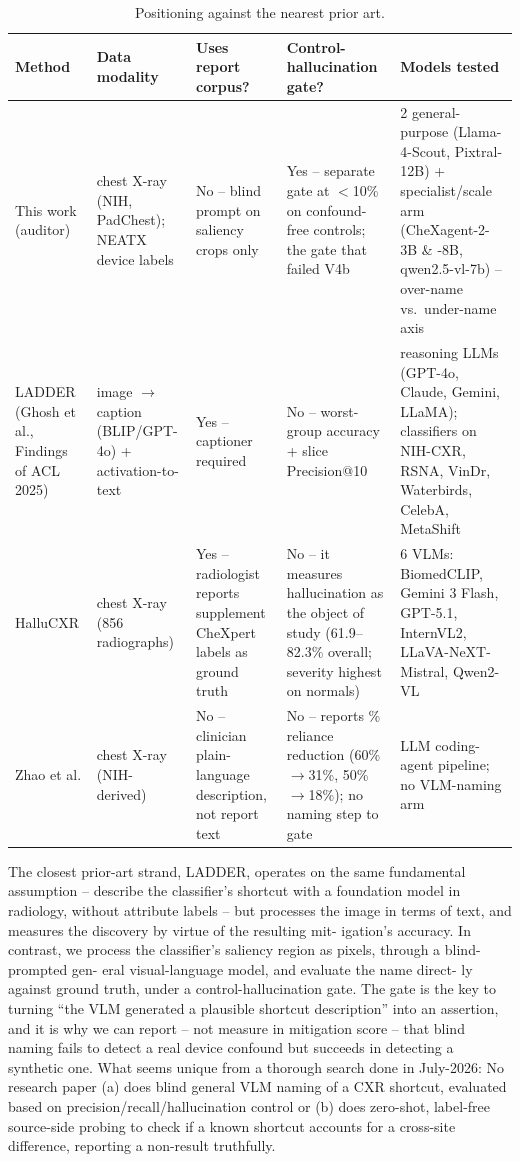 \documentclass{ieeeaccess}
\begin{document}
\begin{table}[t]
\caption{Positioning against the nearest prior art.}
\label{tab:positioning}
\centering
\small
\begin{tabular}{|p{70pt}|p{110pt}|p{80pt}|p{110pt}|p{110pt}|}
\hline
Method & Data modality & Uses report corpus? & Control-hallucination gate? & Models tested \\
\hline
This work (auditor) & chest X-ray (NIH, PadChest); NEATX device labels &
No -- blind prompt on saliency crops only &
Yes -- separate gate at $<$10\% on confound-free controls; the gate that
failed V4b &
2 general-purpose (Llama-4-Scout, Pixtral-12B) + specialist/scale arm
(CheXagent-2-3B \& -8B, qwen2.5-vl-7b) -- over-name vs.\ under-name axis \\
\hline
LADDER (Ghosh et al., Findings of ACL 2025) & image $\rightarrow$ caption
(BLIP/GPT-4o) + activation-to-text & Yes -- captioner required & No --
worst-group accuracy + slice Precision@10 & reasoning LLMs (GPT-4o, Claude,
Gemini, LLaMA); classifiers on NIH-CXR, RSNA, VinDr, Waterbirds, CelebA,
MetaShift \\
\hline
HalluCXR & chest X-ray (856 radiographs) & Yes -- radiologist reports
supplement CheXpert labels as ground truth & No -- it measures hallucination
as the object of study (61.9--82.3\% overall; severity highest on normals) &
6 VLMs: BiomedCLIP, Gemini 3 Flash, GPT-5.1, InternVL2, LLaVA-NeXT-Mistral,
Qwen2-VL \\
\hline
Zhao et al. & chest X-ray (NIH-derived) & No -- clinician plain-language
description, not report text & No -- reports \% reliance reduction
(60\%$\rightarrow$31\%, 50\%$\rightarrow$18\%); no naming step to gate & LLM
coding-agent pipeline; no VLM-naming arm \\
\hline
\end{tabular}
\end{table}


The closest prior-art strand, LADDER, operates on the
same fundamental assumption – describe the classifier’s
shortcut with a foundation model in radiology, without
attribute labels – but processes the image in terms of text,
and measures the discovery by virtue of the resulting mit-
igation’s accuracy. In contrast, we process the classifier’s
saliency region as pixels, through a blind-prompted gen-
eral visual-language model, and evaluate the name direct-
ly against ground truth, under a control-hallucination
gate. The gate is the key to turning “the VLM generated
a plausible shortcut description” into an assertion, and it is
why we can report – not measure in mitigation score –
that blind naming fails to detect a real device confound
but succeeds in detecting a synthetic one. What seems unique from a thorough search done in July-2026: No research paper
(a) does blind general VLM naming of a CXR shortcut, evaluated based on
precision/recall/hallucination control or (b) does zero-shot, label-free
source-side probing to check if a known shortcut accounts for a cross-site
difference, reporting a non-result truthfully.
\end{document}
